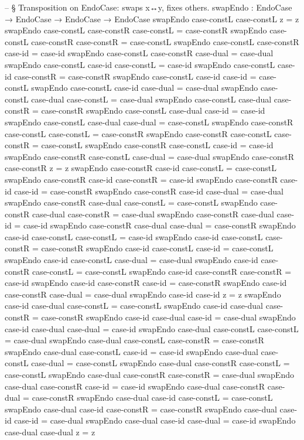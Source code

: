 \documentclass[11pt,a4paper]{book}
\begin{document}
\begin{code}
-- § Transposition on EndoCase: swaps x↔y, fixes others.
swapEndo : EndoCase → EndoCase → EndoCase → EndoCase
swapEndo case-constL case-constL z = z
swapEndo case-constL case-constR case-constL = case-constR
swapEndo case-constL case-constR case-constR = case-constL
swapEndo case-constL case-constR case-id     = case-id
swapEndo case-constL case-constR case-dual   = case-dual
swapEndo case-constL case-id     case-constL = case-id
swapEndo case-constL case-id     case-constR = case-constR
swapEndo case-constL case-id     case-id     = case-constL
swapEndo case-constL case-id     case-dual   = case-dual
swapEndo case-constL case-dual   case-constL = case-dual
swapEndo case-constL case-dual   case-constR = case-constR
swapEndo case-constL case-dual   case-id     = case-id
swapEndo case-constL case-dual   case-dual   = case-constL
swapEndo case-constR case-constL case-constL = case-constR
swapEndo case-constR case-constL case-constR = case-constL
swapEndo case-constR case-constL case-id     = case-id
swapEndo case-constR case-constL case-dual   = case-dual
swapEndo case-constR case-constR z = z
swapEndo case-constR case-id     case-constL = case-constL
swapEndo case-constR case-id     case-constR = case-id
swapEndo case-constR case-id     case-id     = case-constR
swapEndo case-constR case-id     case-dual   = case-dual
swapEndo case-constR case-dual   case-constL = case-constL
swapEndo case-constR case-dual   case-constR = case-dual
swapEndo case-constR case-dual   case-id     = case-id
swapEndo case-constR case-dual   case-dual   = case-constR
swapEndo case-id case-constL case-constL = case-id
swapEndo case-id case-constL case-constR = case-constR
swapEndo case-id case-constL case-id     = case-constL
swapEndo case-id case-constL case-dual   = case-dual
swapEndo case-id case-constR case-constL = case-constL
swapEndo case-id case-constR case-constR = case-id
swapEndo case-id case-constR case-id     = case-constR
swapEndo case-id case-constR case-dual   = case-dual
swapEndo case-id case-id z = z
swapEndo case-id case-dual case-constL = case-constL
swapEndo case-id case-dual case-constR = case-constR
swapEndo case-id case-dual case-id     = case-dual
swapEndo case-id case-dual case-dual   = case-id
swapEndo case-dual case-constL case-constL = case-dual
swapEndo case-dual case-constL case-constR = case-constR
swapEndo case-dual case-constL case-id     = case-id
swapEndo case-dual case-constL case-dual   = case-constL
swapEndo case-dual case-constR case-constL = case-constL
swapEndo case-dual case-constR case-constR = case-dual
swapEndo case-dual case-constR case-id     = case-id
swapEndo case-dual case-constR case-dual   = case-constR
swapEndo case-dual case-id     case-constL = case-constL
swapEndo case-dual case-id     case-constR = case-constR
swapEndo case-dual case-id     case-id     = case-dual
swapEndo case-dual case-id     case-dual   = case-id
swapEndo case-dual case-dual z = z


\end{code}
\end{document}
